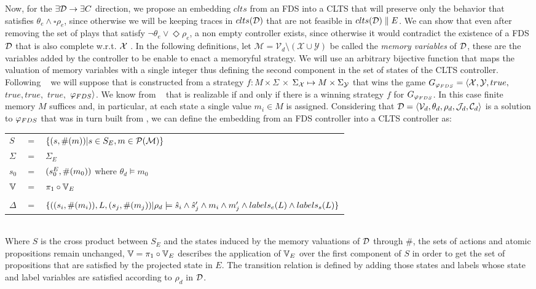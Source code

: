 Now,  for the $\exists \mathcal{D} \rightarrow \exists C$ direction, we propose an embedding $clts$ from an FDS into a CLTS that will preserve only the behavior that satisfies $\theta_e \wedge \square \rho_e$, since otherwise we will be keeping traces in $clts(\mathcal{D})$ that are not feasible in $clts(\mathcal{D})\parallel E$. We can show that even after removing the set of plays that satisfy $\neg \theta_e \vee \Diamond \rho_e$, a non empty controller exists, since otherwise it would contradict the existence of a FDS $\mathcal{D}$ that is also complete w.r.t. ${\mathcal{X}}$ . In the following definitions, let $\mathcal{M}= \mathcal{V}_d\setminus (\mathcal{X} \cup \mathcal{Y})$ be called the \emph{memory variables} of $\mathcal{D}$, these are the variables added by the controller to be enable to enact a memoryful strategy. We will use an arbitrary bijective function \enumSetDef that maps the valuation of memory variables with a single integer thus defining the second component in the set of states of the CLTS controller. 
Following ~\cite{bloem2012synthesis} we will suppose that \fdsD is constructed from a strategy $f: M \times \Sigma$ $\times$ $\Sigma_{{\mathcal{X}}} \mapsto M \times \Sigma_{{\mathcal{Y}}}$
that wins the game $G_{\varphi_{FDS}}=\langle {\ensuremath{\mathcal{X}}}, {\mathcal{Y}}, true,$ $true, true,$ $true,$ $\varphi_{FDS} \rangle$. We know from ~\cite{bloem2012synthesis} that \varphiLTL is realizable if and only if there is a winning strategy $f$ for $G_{\varphi_{FDS}}$. In this case finite memory $M$ suffices and, in particular, at each state a single value $m_i \in M$ is assigned. 
Considering that $\mathcal{D}= \langle \mathcal{V}_d, \theta_d, \rho_d, \mathcal{J}_d, \mathcal{C}_d\rangle$ is a solution to $\varphi_{FDS}$ that was in turn built from \controlProblemDef, we can define the embedding from an FDS controller \fdsD into a CLTS controller \cltsEmbeddingDef{\fdsD}  as:

\vspace{1em}
\begin{tabular}{ l c l }
	$S$ &$=$& $\{(s,\#(m)) | s \in S_E, m \in \mathcal{P}(\mathcal{M}) \}$\\
	$\Sigma$ &$=$&$\Sigma_E$\\	
	$s_0$&$=$&$(s_0^{E}, \#(m_0))$ where $\theta_d \models m_0$ \\
	$\mathbb{V}$&$=$&$\pi_1 \circ \mathbb{V}_E$\\
	&&\\
	$\Delta$&$=$&$\{((s_i,\#(m_i)),L,(s_j,\#(m_j))| \rho_d \models \hat{s}_{i} \wedge \hat{s}_{j}' \wedge m_i \wedge m_j' \wedge labels_e(L) \wedge labels_s(L) \}$\\
\end{tabular}
\vspace{1em}
\\
Where $S$ is the cross product between $S_E$ and the states induced by the memory valuations of $\mathcal{D}$ through $\#$, the sets of actions and atomic propositions remain unchanged, $\mathbb{V}=\pi_1 \circ \mathbb{V}_E$ describes the application of $\mathbb{V}_E$ over the first component of $S$ in order to get the set of propositions that are satisfied by the projected state in $E$. The transition relation is defined by adding those states and labels whose state and label variables are satisfied according to $\rho_d$ in $\mathcal{D}$.

